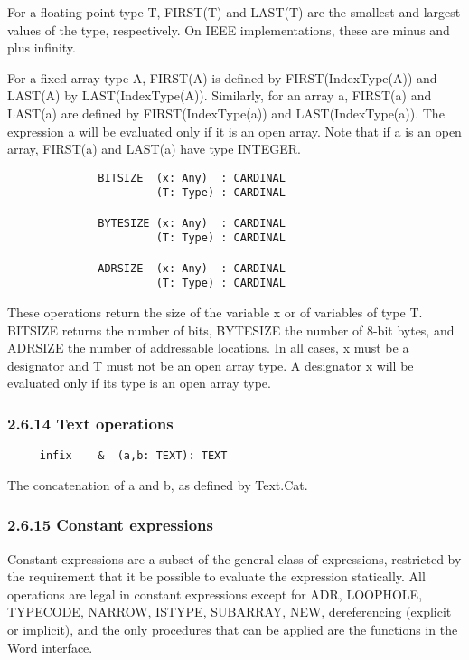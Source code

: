 \documentclass[10pt]{article}
\begin{document}
For a floating-point type T, FIRST(T) and LAST(T) are the smallest and largest
values of the type, respectively.  On IEEE implementations, these are minus
and plus infinity.

For a fixed array type A, FIRST(A) is defined by FIRST(IndexType(A)) and
LAST(A) by LAST(IndexType(A)).  Similarly, for an array a, FIRST(a) and
LAST(a) are defined by FIRST(IndexType(a)) and LAST(IndexType(a)).  The
expression a will be evaluated only if it is an open array.  Note that if a is
an open array, FIRST(a) and LAST(a) have type INTEGER.

\begin{verbatim}
              BITSIZE  (x: Any)  : CARDINAL
                       (T: Type) : CARDINAL

              BYTESIZE (x: Any)  : CARDINAL
                       (T: Type) : CARDINAL

              ADRSIZE  (x: Any)  : CARDINAL
                       (T: Type) : CARDINAL
\end{verbatim}
These operations return the size of the variable x or of variables of type T.
BITSIZE returns the number of bits, BYTESIZE the number of 8-bit bytes, and
ADRSIZE the number of addressable locations.  In all cases, x must be a
designator and T must not be an open array type.  A designator x will be
evaluated only if its type is an open array type.

\subsubsection*{2.6.14 Text operations}

\begin{verbatim}
     infix    &  (a,b: TEXT): TEXT
\end{verbatim}
The concatenation of a and b, as defined by Text.Cat.

\subsubsection*{2.6.15 Constant expressions}

Constant expressions are a subset of the general class of expressions,
restricted by the requirement that it be possible to evaluate the expression
statically.  All operations are legal in constant expressions except for ADR,
LOOPHOLE, TYPECODE, NARROW, ISTYPE, SUBARRAY, NEW, dereferencing (explicit or
implicit), and the only procedures that can be applied are the functions in
the Word interface.
\end{document}
